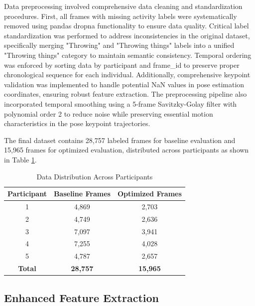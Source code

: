 \documentclass{iopconfser}
\begin{document}
Data preprocessing involved comprehensive data cleaning and standardization procedures. First, all frames with missing activity labels were systematically removed using pandas dropna functionality to ensure data quality. Critical label standardization was performed to address inconsistencies in the original dataset, specifically merging "Throwing" and "Throwing things" labels into a unified "Throwing things" category to maintain semantic consistency. Temporal ordering was enforced by sorting data by participant and frame\_id to preserve proper chronological sequence for each individual. Additionally, comprehensive keypoint validation was implemented to handle potential NaN values in pose estimation coordinates, ensuring robust feature extraction. The preprocessing pipeline also incorporated temporal smoothing using a 5-frame Savitzky-Golay filter with polynomial order 2 to reduce noise while preserving essential motion characteristics in the pose keypoint trajectories.

The final dataset contains 28,757 labeled frames for baseline evaluation and 15,965 frames for optimized evaluation, distributed across participants as shown in Table \ref{tab:data_distribution}.

\begin{table}[H]
\centering
\caption{Data Distribution Across Participants}
\label{tab:data_distribution}
\begin{tabular}{ccc}
\toprule
\textbf{Participant} & \textbf{Baseline Frames} & \textbf{Optimized Frames} \\
\midrule
1 & 4,869 & 2,703 \\
2 & 4,749 & 2,636 \\
3 & 7,097 & 3,941 \\
4 & 7,255 & 4,028 \\
5 & 4,787 & 2,657 \\
\midrule
\textbf{Total} & \textbf{28,757} & \textbf{15,965} \\
\bottomrule
\end{tabular}
\end{table}

\subsection{Enhanced Feature Extraction}
\end{document}
